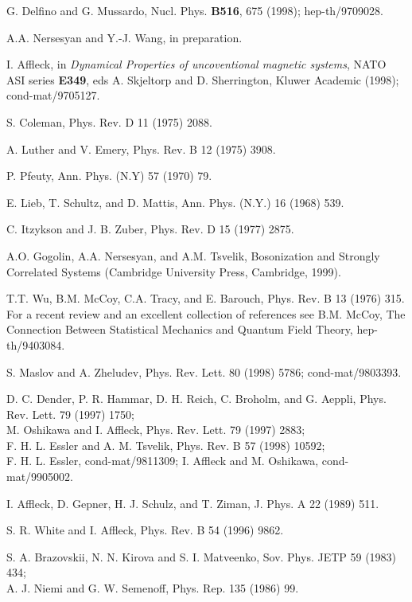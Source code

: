 \begin{thebibliography}{99}

 G. Delfino and  G. Mussardo,
 Nucl. Phys. {\bf B516}, 675 (1998);
hep-th/9709028.

 A.A. Nersesyan and Y.-J. Wang, in preparation. 

I. Affleck, in {\sl Dynamical Properties of uncoventional 
magnetic systems}, NATO ASI series {\bf E349}, eds A. Skjeltorp and 
D. Sherrington, Kluwer Academic (1998);
cond-mat/9705127.


 S. Coleman, Phys. Rev. D 11 (1975)
2088.

 A. Luther and V. Emery, Phys. Rev. B 12 (1975)
3908.

 P. Pfeuty,
 Ann. Phys. (N.Y) 57 (1970) 79.

 E. Lieb, T. Schultz, and D. Mattis,
Ann. Phys. (N.Y.) 16 (1968) 539.


 C. Itzykson and J. B. Zuber, Phys. Rev. D 15 (1977)
2875.

 A.O. Gogolin, A.A. Nersesyan, and
A.M. Tsvelik, Bosonization and Strongly
Correlated Systems (Cambridge University Press,
Cambridge, 1999).

 T.T. Wu, B.M. McCoy, C.A. Tracy,
and E. Barouch, Phys. Rev. B 13 (1976) 315.    
For a recent review
and an excellent collection of references
see B.M. McCoy, The Connection Between
Statistical Mechanics and Quantum Field Theory,
hep-th/9403084.


 S. Maslov and A. Zheludev, Phys. Rev. Lett.
80 (1998) 5786; cond-mat/9803393.

 D. C. Dender, P. R. Hammar, D. H. Reich, C. Broholm,
and G. Aeppli, Phys. Rev. Lett. 79 (1997) 1750;\\
M. Oshikawa and I. Affleck, Phys. Rev. Lett. 79 (1997) 2883;\\
F. H. L. Essler and A. M. Tsvelik, Phys. Rev. B 57 (1998) 10592;\\
F. H. L. Essler,  cond-mat/9811309;
I. Affleck and M. Oshikawa, cond-mat/9905002.


 I. Affleck, D. Gepner, H. J. Schulz, and 
T. Ziman, J. Phys. A 22 (1989) 511.

S. R. White and I. Affleck, Phys. Rev. B 54 (1996) 9862.


 S. A. Brazovskii, N. N. Kirova and S. I. Matveenko,
Sov. Phys. JETP  59 (1983) 434;\\
A. J. Niemi and G. W. Semenoff, Phys. Rep. 135 (1986) 99.



\end{thebibliography}
